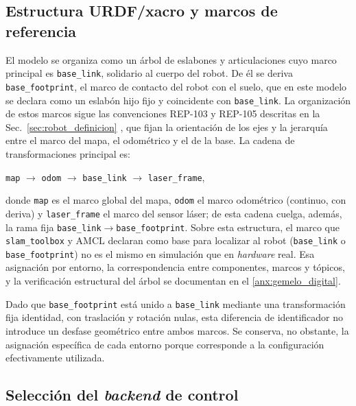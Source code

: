 \subsection{Estructura URDF/xacro y marcos de referencia}
\label{sec:tf-convenciones}

El modelo se organiza como un árbol de eslabones y articulaciones cuyo marco
principal es \texttt{base\_link}, solidario al cuerpo del robot. De él se deriva
\texttt{base\_footprint}, el marco de contacto del robot con el suelo, que en
este modelo se declara como un eslabón hijo fijo y coincidente con
\texttt{base\_link}. La organización de estos marcos sigue las convenciones
REP-103 y REP-105 descritas en la Sec.~\ref{sec:robot_definicion}
\citep{rep103,rep105}, que fijan la orientación de los ejes y la jerarquía entre
el marco del mapa, el odométrico y el de la base.
La cadena de transformaciones principal es:

\begin{center}
\texttt{map} $\rightarrow$ \texttt{odom} $\rightarrow$ \texttt{base\_link} $\rightarrow$ \texttt{laser\_frame},
\end{center}

\noindent donde \texttt{map} es el marco global del mapa, \texttt{odom} el marco
odométrico (continuo, con deriva) y \texttt{laser\_frame} el marco del sensor
láser; de esta cadena cuelga, además, la rama fija
\texttt{base\_link}$\rightarrow$\texttt{base\_footprint}.
Sobre esta estructura, el marco que \texttt{slam\_toolbox} y AMCL declaran como
base para localizar al robot (\texttt{base\_link} o \texttt{base\_footprint})
no es el mismo en simulación que en \textit{hardware} real. Esa asignación por entorno,
la correspondencia entre componentes, marcos y tópicos, y la verificación
estructural del árbol se documentan en el \ref{anx:gemelo_digital}.

Dado que \texttt{base\_footprint} está unido a \texttt{base\_link}
mediante una transformación fija identidad, con traslación y rotación nulas,
esta diferencia de identificador no introduce un desfase geométrico entre
ambos marcos. Se conserva, no obstante, la asignación específica de cada
entorno porque corresponde a la configuración efectivamente utilizada.

\subsection{Selección del \texorpdfstring{\textit{backend}}{backend} de control}
\label{sec:backend}

